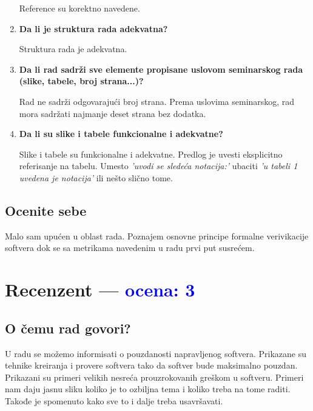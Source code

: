 \documentclass[a4paper]{report}
\newcommand{\odgovor}[1]{\textcolor{blue}{#1}}
\begin{document}
\begin{enumerate}
Reference su korektno navedene.\\
\item \textbf{Da li je struktura rada adekvatna?}

Struktura rada je adekvatna.\\
\item \textbf{Da li rad sadrži sve elemente propisane uslovom seminarskog rada (slike, tabele, broj strana...)?}

Rad ne sadrži odgovarajući broj strana. Prema uslovima seminarskog, rad mora sadržati najmanje deset strana bez dodatka.\\
\item \textbf{Da li su slike i tabele funkcionalne i adekvatne?}

Slike i tabele su funkcionalne i adekvatne. Predlog je uvesti eksplicitno referisanje na tabelu. Umesto \textit{'uvodi se sledeća notacija:'} ubaciti \textit{'u tabeli 1 uvedena je notacija'} ili nešto slično tome.\\
\end{enumerate}

\section{Ocenite sebe}
Malo sam upućen u oblast rada. Poznajem osnovne principe formalne verivikacije softvera dok se sa metrikama navedenim u radu prvi put susrećem.


\chapter{Recenzent \odgovor{--- ocena: 3} }


\section{O čemu rad govori?}
U radu se možemo informisati o pouzdanosti napravljenog softvera. Prikazane su tehnike kreiranja i provere softvera tako da softver bude maksimalno pouzdan. Prikazani su primeri velikih nesreća prouzrokovanih greškom u softveru. Primeri nam daju jasnu sliku koliko je to ozbiljna tema i koliko treba na tome raditi. Takođe je spomenuto kako sve to i dalje treba usavršavati.
\end{document}
